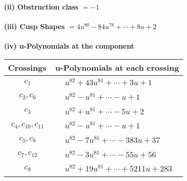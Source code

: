 \documentclass[1p]{elsarticle_modified}
\theoremstyle{definition}
\begin{document}
\flushleft \textbf{(ii) Obstruction class $= -1$}\\~\\
\flushleft \textbf{(iii) Cusp Shapes $= 4 u^{80}-84 u^{78}+\cdots+8 u+2$}\\~\\
\newpage\renewcommand{\arraystretch}{1}
\flushleft \textbf{(iv) u-Polynomials at the component}\newline \\
\begin{tabular}{m{50pt}|m{274pt}}
Crossings & \hspace{64pt}u-Polynomials at each crossing \\
\hline $$\begin{aligned}c_{1}\end{aligned}$$&$\begin{aligned}
&u^{82}+43 u^{81}+\cdots+3 u+1
\end{aligned}$\\
\hline $$\begin{aligned}c_{2},c_{6}\end{aligned}$$&$\begin{aligned}
&u^{82}- u^{81}+\cdots- u+1
\end{aligned}$\\
\hline $$\begin{aligned}c_{3}\end{aligned}$$&$\begin{aligned}
&u^{82}+u^{81}+\cdots-5 u+2
\end{aligned}$\\
\hline $$\begin{aligned}c_{4},c_{10},c_{11}\end{aligned}$$&$\begin{aligned}
&u^{82}- u^{81}+\cdots- u+1
\end{aligned}$\\
\hline $$\begin{aligned}c_{5},c_{8}\end{aligned}$$&$\begin{aligned}
&u^{82}-7 u^{81}+\cdots-383 u+37
\end{aligned}$\\
\hline $$\begin{aligned}c_{7},c_{12}\end{aligned}$$&$\begin{aligned}
&u^{82}-3 u^{81}+\cdots-55 u+56
\end{aligned}$\\
\hline $$\begin{aligned}c_{9}\end{aligned}$$&$\begin{aligned}
&u^{82}+19 u^{81}+\cdots+5211 u+283
\end{aligned}$\\
\hline
\end{tabular}\\~\\
\end{document}
